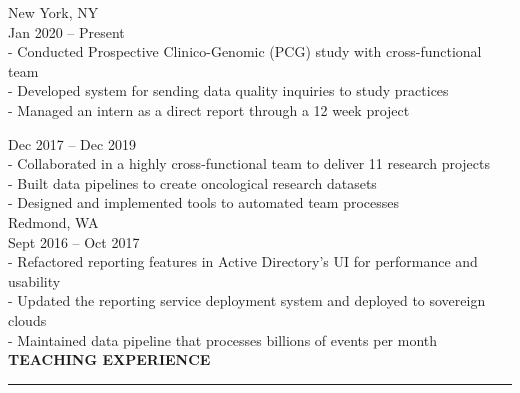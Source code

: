 \documentclass{resume} %
\begin{document}
\hspace*{1mm}{\bf Flatiron Health } \hfill New York, NY \\
\hspace*{1mm}{\em Senior Software Engineer, Clinical Research } \hfill Jan 2020 -- Present \\
\hspace*{3mm}- Conducted Prospective Clinico-Genomic (PCG) study with cross-functional team \\
\hspace*{3mm}- Developed system for sending data quality inquiries to study practices \\
\hspace*{3mm}- Managed an intern as a direct report through a 12 week project


\hspace*{1mm}{\em Software Engineer, Real World Evidence } \hfill Dec 2017 -- Dec 2019 \\
\hspace*{3mm}- Collaborated in a highly cross-functional team to deliver 11 research projects \\
\hspace*{3mm}- Built data pipelines to create oncological research datasets \\
\hspace*{3mm}- Designed and implemented tools to automated team processes \\


\hspace*{1mm}{\bf Microsoft } \hfill Redmond, WA \\
\hspace*{1mm}{\em Software Engineer, Azure Active Directory} \hfill Sept 2016 -- Oct 2017 \\
\hspace*{3mm}- Refactored reporting features in Active Directory’s UI for performance and usability \\
\hspace*{3mm}- Updated the reporting service deployment system and deployed to sovereign clouds \\
\hspace*{3mm}- Maintained data pipeline that processes billions of events per month \\


\medskip
\MakeUppercase{{\bf Teaching Experience}}
\medskip
\hrule
\end{document}
